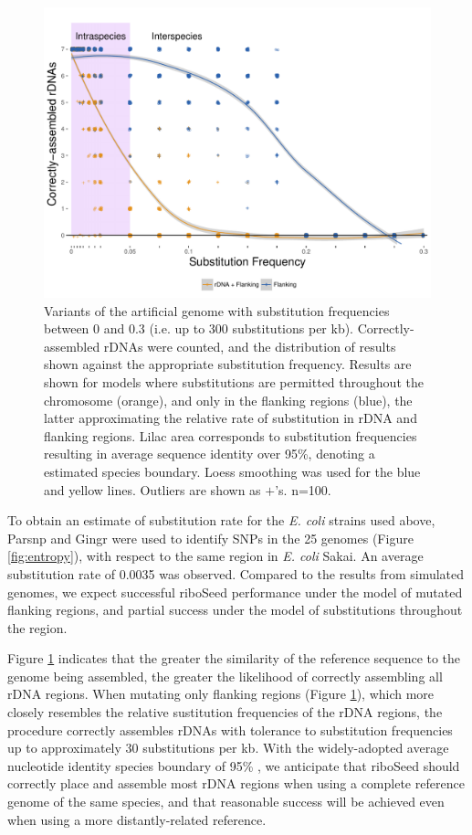 \documentclass[a4,center,fleqn]{NAR}
\begin{document}
\begin{figure}[!b]
  \centering
    \includegraphics[width=.9\columnwidth]{degenerate_lineplot}
  \caption{Variants of the artificial genome with substitution frequencies between 0 and 0.3 (i.e. up to 300 substitutions per kb). Correctly-assembled rDNAs were counted, and the distribution of results shown against the appropriate substitution frequency. Results are shown for models where substitutions are permitted throughout the chromosome (orange), and only in the flanking regions (blue), the latter approximating the relative rate of substitution in rDNA and flanking regions. Lilac area corresponds to substitution frequencies resulting in average sequence identity over 95\%, denoting a estimated species boundary. Loess smoothing was used for the blue and yellow lines. Outliers are shown as $+$'s. n=100.}
  \label{fig:degen}
\end{figure}


To obtain an estimate of substitution rate for the \textit{E. coli} strains used above, Parsnp \cite{Treangen2014} and Gingr \cite{Treangen2014} were used to identify SNPs in the 25 genomes (Figure \ref{fig:entropy}), with respect to the same region in \textit{E. coli} Sakai. An average substitution rate of 0.0035 was observed. Compared to the results from simulated genomes, we expect successful riboSeed performance under the model of mutated flanking regions, and partial success under the model of substitutions throughout the region.


Figure \ref{fig:degen} indicates that the greater the similarity of the reference sequence to the genome being assembled, the greater the likelihood of correctly assembling all rDNA regions. When mutating only flanking regions (Figure \ref{fig:degen}), which more closely resembles the relative sustitution frequencies of the rDNA regions, the procedure correctly assembles rDNAs with tolerance to substitution frequencies up to approximately 30 substitutions per kb.  With the widely-adopted average nucleotide identity species boundary of 95\% \cite{Goris2007a}, we anticipate that riboSeed should correctly place and assemble most rDNA regions when using a complete reference genome of the same species, and that reasonable success will be achieved even when using a more distantly-related reference.
\end{document}
